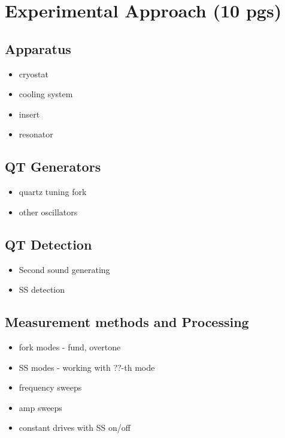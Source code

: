 \chapter{Experimental Approach (10 pgs)}

\section{Apparatus}
\begin{itemize}
	\item cryostat
	\item cooling system
	\item insert
	\item resonator
\end{itemize}

\section{QT Generators}
\begin{itemize}
	\item quartz tuning fork
	\item other oscillators
\end{itemize}

\section{QT Detection}
\begin{itemize}
	\item Second sound generating
	\item SS detection
\end{itemize}

\section{Measurement methods and Processing}
\begin{itemize}
	\item fork modes - fund, overtone
	\item SS modes - working with ??-th mode
	\item frequency sweeps
	\item amp sweeps
	\item constant drives with SS on/off
\end{itemize}

\newpage

